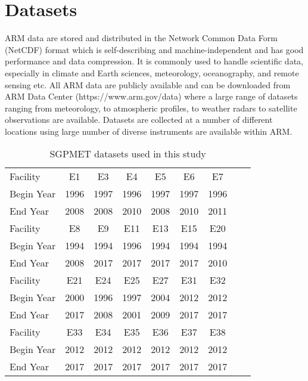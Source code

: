 \section{Datasets}
ARM data are stored and distributed in the Network Common Data Form (NetCDF) format which
is self-describing and machine-independent \cite{rew1990netcdf, NetCDF}
and has good performance and data compression. It is commonly used to
handle scientific data, especially in climate and Earth sciences,
meteorology, oceanography, and remote sensing etc. 
All ARM data are publicly available and can be downloaded from ARM Data Center
(https://www.arm.gov/data) where a large range of datasets ranging  
from meteorology, to atmospheric profiles, to weather radars to
satellite observations are available. Datasets are collected at a number
of different locations using large number of diverse
instruments are available within ARM. 

\begin{table}[ht]
\caption{SGPMET datasets used in this study}
\label{tab:datasets}
\centering
\begin{tabular}{|l|c|c|c|c|c|c|c|c|}
\hline
Facility & E1 & E3 & E4 & E5 & E6 & E7\\
Begin Year & 1996 & 1997 & 1996 & 1997 & 1997 & 1996\\
End Year & 2008 & 2008 & 2010 & 2008 & 2010 & 2011\\
\hline
Facility & E8 & E9 & E11 & E13 & E15 & E20\\
Begin Year & 1994 & 1994 & 1996 & 1994 & 1994 & 1994\\
End Year & 2008 & 2017 & 2017 & 2017 & 2017 & 2010\\
\hline
Facility & E21 & E24 & E25 & E27 & E31 & E32\\
Begin Year & 2000 & 1996 & 1997 & 2004 & 2012 & 2012\\
End Year & 2017 & 2008 & 2001 & 2009 & 2017 & 2017\\
\hline
Facility & E33 & E34 & E35 & E36 & E37 & E38\\
Begin Year & 2012 & 2012 & 2012 & 2012 & 2012 & 2012\\
End Year & 2017 & 2017 & 2017 & 2017 & 2017 & 2017\\
\hline
\end{tabular}
\end{table}

